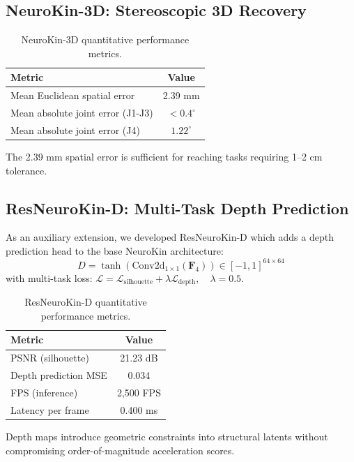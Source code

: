 \documentclass[12pt,a4paper,oneside]{report}
\begin{document}
\subsection{NeuroKin-3D: Stereoscopic 3D Recovery}

\begin{table}[H]
\centering
\caption{NeuroKin-3D quantitative performance metrics.}
\label{tab:neurokin3d_performance}
\begin{tabular}{lc}
\toprule
Metric & Value \\
\midrule
Mean Euclidean spatial error & 2.39 mm \\
Mean absolute joint error (J1-J3) & $<0.4^\circ$ \\
Mean absolute joint error (J4) & $1.22^\circ$ \\
\bottomrule
\end{tabular}
\end{table}

The 2.39 mm spatial error is sufficient for reaching tasks requiring 1--2 cm tolerance.

\subsection{ResNeuroKin-D: Multi-Task Depth Prediction}

As an auxiliary extension, we developed ResNeuroKin-D which adds a depth prediction head to the base NeuroKin architecture:
\begin{equation}
\hat{D} = \tanh(\text{Conv2d}_{1\times1}(\mathbf{F}_4)) \in [-1, 1]^{64 \times 64}
\end{equation}
with multi-task loss: $\mathcal{L} = \mathcal{L}_{\text{silhouette}} + \lambda \mathcal{L}_{\text{depth}}, \quad \lambda = 0.5$.

\begin{table}[H]
\centering
\caption{ResNeuroKin-D quantitative performance metrics.}
\label{tab:resneurokin_performance}
\begin{tabular}{lc}
\toprule
Metric & Value \\
\midrule
PSNR (silhouette) & 21.23 dB \\
Depth prediction MSE & 0.034 \\
FPS (inference) & 2,500 FPS \\
Latency per frame & 0.400 ms \\
\bottomrule
\end{tabular}
\end{table}

Depth maps introduce geometric constraints into structural latents without compromising order-of-magnitude acceleration scores.
\end{document}
